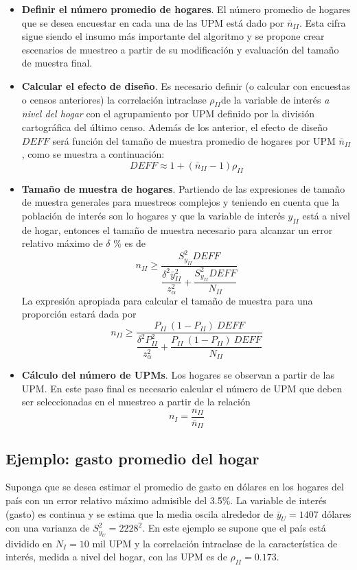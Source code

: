 \documentclass[12pt,spanish,]{book}
\begin{document}
\begin{itemize}
\item
  \textbf{Definir el número promedio de hogares}. El número promedio de hogares que se desea encuestar en cada una de las UPM está dado por \(\bar{n}_{II}\). Esta cifra sigue siendo el insumo más importante del algoritmo y se propone crear escenarios de muestreo a partir de su modificación y evaluación del tamaño de muestra final.
\item
  \textbf{Calcular el efecto de diseño}. Es necesario definir (o calcular con encuestas o censos anteriores) la correlación intraclase \(\rho_{II}\)de la variable de interés \emph{a nivel del hogar} con el agrupamiento por UPM definido por la división cartográfica del último censo. Además de los anterior, el efecto de diseño \(DEFF\) será función del tamaño de muestra promedio de hogares por UPM \(\bar{n}_{II}\), como se muestra a continuación:
  \[
  DEFF \approx 1 + (\bar{n}_{II} - 1)\rho_{II}
  \]
\item
  \textbf{Tamaño de muestra de hogares}. Partiendo de las expresiones de tamaño de muestra generales para muestreos complejos y teniendo en cuenta que la población de interés son lo hogares y que la variable de interés \(y_{II}\) está a nivel de hogar, entonces el tamaño de muestra necesario para alcanzar un error relativo máximo de \(\delta\) \% es de
  \[
  n_{II} \geq \dfrac{S^2_{y_{II}}DEFF}{\dfrac{\delta^2 \bar{y}_{II}^2}{z_{\alpha}^2}+\dfrac{S^2_{y_{II}}DEFF}{N_{II}}}
  \]
  La expresión apropiada para calcular el tamaño de muestra para una proporción estará dada por
  \[
  n_{II} \geq \dfrac{P_{II}\ (1-P_{II})\ DEFF}{\dfrac{\delta^2P^2_{II}}{z_{\alpha}^2 }+\dfrac{P_{II}\ (1-P_{II}) \ DEFF}{N_{II}}}
  \]
\item
  \textbf{Cálculo del número de UPMs}. Los hogares se observan a partir de las UPM. En este paso final es necesario calcular el número de UPM que deben ser seleccionadas en el muestreo a partir de la relación
  \[
  n_{I} = \frac{n_{II}}{\bar{n}_{II}}
  \]
\end{itemize}

\hypertarget{ejemplo-gasto-promedio-del-hogar}{%
\subsection{Ejemplo: gasto promedio del hogar}\label{ejemplo-gasto-promedio-del-hogar}}

Suponga que se desea estimar el promedio de gasto en dólares en los hogares del país con un error relativo máximo admisible del 3.5\%. La variable de interés (gasto) es continua y se estima que la media oscila alrededor de \(\bar{y}_U=1407\) dólares con una varianza de \(S^2_{y_U}=2228^2\). En este ejemplo se supone que el país está dividido en \(N_I = 10\) mil UPM y la correlación intraclase de la característica de interés, medida a nivel del hogar, con las UPM es de \(\rho_{II} = 0.173\).
\end{document}
